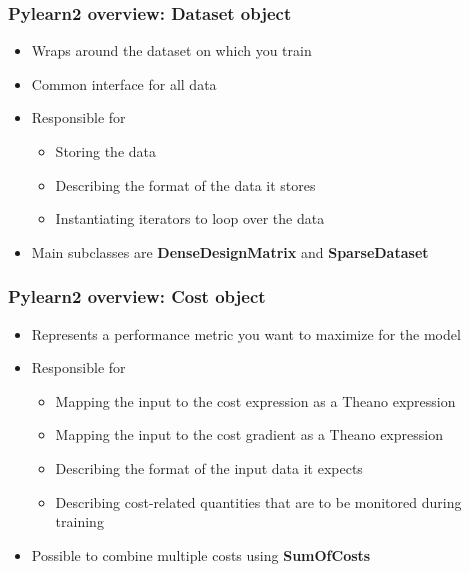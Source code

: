 \documentclass[mathserif, xcolor=dvipsnames]{beamer}
\begin{document}
\begin{frame}
    \frametitle{Pylearn2 overview: \textbf{Dataset} object}
    \begin{itemize}\addtolength{\itemsep}{0.5\baselineskip}
        \item{Wraps around the dataset on which you train}
        \item{Common interface for all data}
        \item{
            Responsible for
            \begin{itemize}
                \item{Storing the data}
                \item{Describing the format of the data it stores}
                \item{Instantiating iterators to loop over the data}
            \end{itemize}
        }
        \item{Main subclasses are \textbf{DenseDesignMatrix} and
              \textbf{SparseDataset}}
    \end{itemize}

\end{frame}

\begin{frame}
    \frametitle{Pylearn2 overview: \textbf{Cost} object}
    \begin{itemize}\addtolength{\itemsep}{0.5\baselineskip}
        \item{Represents a performance metric you want to maximize for the model}
        \item{
            Responsible for
            \begin{itemize}
                \item{Mapping the input to the cost expression as a Theano
                      expression}
                \item{Mapping the input to the cost gradient as a Theano
                      expression}
                \item{Describing the format of the input data it expects}
                \item{Describing cost-related quantities that are to be
                      monitored during training}
            \end{itemize}
        }
        \item{Possible to combine multiple costs using \textbf{SumOfCosts}}
    \end{itemize}

\end{frame}
\end{document}
